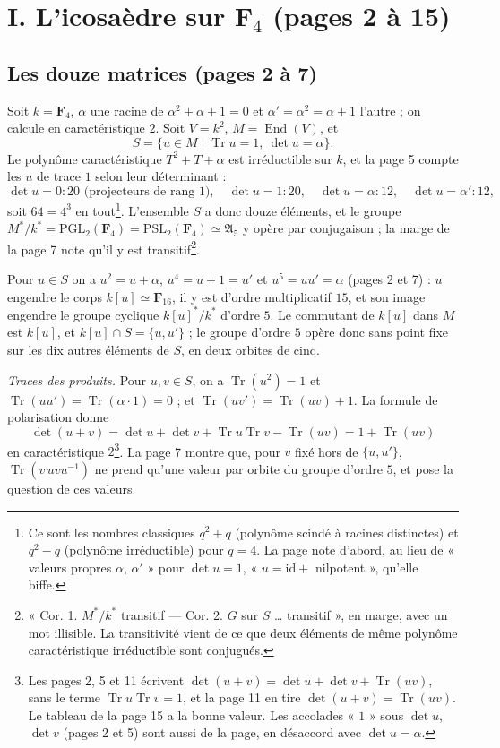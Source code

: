 \documentclass[11pt,a4paper]{article}
\begin{document}
\section*{I. L'icosaèdre sur $\mathbf{F}_4$ (pages 2 à 15)}

\subsection*{Les douze matrices (pages 2 à 7)}

Soit $k = \mathbf{F}_4$, $\alpha$ une racine de $\alpha^2 + \alpha + 1 = 0$ et
$\alpha' = \alpha^2 = \alpha + 1$ l'autre ; on calcule en caractéristique $2$.
Soit $V = k^2$, $M = \operatorname{End}(V)$, et
\[
  S = \{u \in M \mid \operatorname{Tr}u = 1,\ \det u = \alpha\}.
\]
Le polynôme caractéristique $T^2 + T + \alpha$ est irréductible sur $k$, et la
page 5 compte les $u$ de trace $1$ selon leur déterminant :
\[
  \det u = 0 : 20 \text{ (projecteurs de rang } 1),\quad
  \det u = 1 : 20,\quad
  \det u = \alpha : 12,\quad
  \det u = \alpha' : 12,
\]
soit $64 = 4^3$ en tout\footnote{Ce sont les nombres classiques $q^2 + q$
(polynôme scindé à racines distinctes) et $q^2 - q$ (polynôme irréductible)
pour $q = 4$. La page note d'abord, au lieu de « valeurs propres $\alpha$,
$\alpha'$ » pour $\det u = 1$, « $u = \mathrm{id} + $ nilpotent », qu'elle biffe.}.
L'ensemble $S$ a donc douze éléments, et le groupe $M^{*}/k^{*} =
\mathrm{PGL}_2(\mathbf{F}_4) = \mathrm{PSL}_2(\mathbf{F}_4) \simeq
\mathfrak{A}_5$ y opère par conjugaison ; la marge de la page 7 note qu'il y
est transitif\footnote{« Cor. 1. $M^{*}/k^{*}$ transitif — Cor. 2. $G$ sur $S$
… transitif », en marge, avec un mot illisible. La transitivité vient de ce
que deux éléments de même polynôme caractéristique irréductible sont
conjugués.}.

Pour $u \in S$ on a $u^2 = u + \alpha$, $u^4 = u + 1 = u'$ et $u^5 = uu' =
\alpha$ (pages 2 et 7) : $u$ engendre le corps $k[u] \simeq \mathbf{F}_{16}$,
il y est d'ordre multiplicatif $15$, et son image engendre le groupe cyclique
$k[u]^{*}/k^{*}$ d'ordre $5$. Le commutant de $k[u]$ dans $M$ est $k[u]$, et
$k[u] \cap S = \{u, u'\}$ ; le groupe d'ordre $5$ opère donc sans point fixe
sur les dix autres éléments de $S$, en deux orbites de cinq.

\emph{Traces des produits.} Pour $u, v \in S$, on a $\operatorname{Tr}(u^2) =
1$ et $\operatorname{Tr}(uu') = \operatorname{Tr}(\alpha\cdot 1) = 0$ ; et
$\operatorname{Tr}(uv') = \operatorname{Tr}(uv) + 1$. La formule de
polarisation donne
\[
  \det(u + v) = \det u + \det v + \operatorname{Tr}u\operatorname{Tr}v
  - \operatorname{Tr}(uv) = 1 + \operatorname{Tr}(uv)
\]
en caractéristique $2$\footnote{Les pages 2, 5 et 11 écrivent $\det(u+v) =
\det u + \det v + \operatorname{Tr}(uv)$, sans le terme
$\operatorname{Tr}u\operatorname{Tr}v = 1$, et la page 11 en tire
$\det(u+v) = \operatorname{Tr}(uv)$. Le tableau de la page 15 a la bonne
valeur. Les accolades « $1$ » sous $\det u$, $\det v$ (pages 2 et 5) sont aussi
de la page, en désaccord avec $\det u = \alpha$.}. La page 7 montre que, pour
$v$ fixé hors de $\{u, u'\}$, $\operatorname{Tr}(v\,u v u^{-1})$ ne prend
qu'une valeur par orbite du groupe d'ordre $5$, et pose la question de ces
valeurs.
\end{document}
